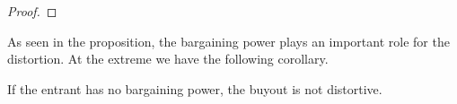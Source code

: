 \begin{proof}




\end{proof}
As seen in the proposition, the bargaining power plays an important role for the distortion. At the extreme we have the following corollary.  
\begin{corollary}\label{barprof}
If the entrant has no bargaining power, the buyout is not distortive. 
\end{corollary}


